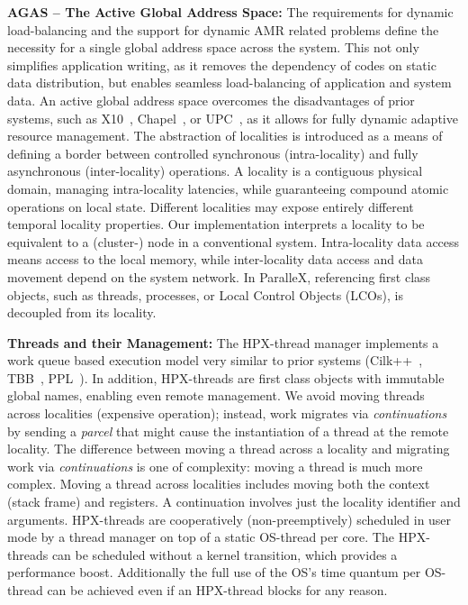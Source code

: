 \documentclass{revtex4}
\newcommand{\I}[1]{\textit{#1}}
\newcommand{\B}[1]{\textbf{#1}}
\begin{document}
\B{AGAS -- The Active Global Address Space:} The requirements for dynamic
load-balancing and the support for dynamic AMR related problems define the
necessity for a single global address space across the system. This not only
simplifies application writing, as it removes the dependency of codes on static
data distribution, but enables seamless load-balancing of application and system
data. An active global address space overcomes the disadvantages of prior systems,
such as X10~\cite{Charles:2005:XOA:1103845.1094852}, Chapel~\cite{Chamberlain07parallelprogrammability},
or UPC~\cite{UPCSpec}, as it allows for fully dynamic adaptive resource management.
The abstraction of localities is introduced as a means of defining a
border between controlled synchronous (intra-locality) and fully asynchronous
(inter-locality) operations. A locality is a contiguous physical domain,
managing intra-locality latencies, while guaranteeing compound atomic operations
on local state. Different localities may expose entirely different temporal
locality properties. Our implementation interprets a locality to be equivalent
to a (cluster-) node in a conventional system. Intra-locality data access means access to
the local memory, while inter-locality data access and data movement
depend on the system network. In ParalleX, referencing first class objects, such as threads,
processes, or Local Control Objects (LCOs),  is decoupled from its locality.

\B{Threads and their Management:} The HPX-thread manager implements a work queue
based execution model very similar to prior systems (Cilk++~\cite{cilk++},
TBB~\cite{inteltbb}, PPL~\cite{microsoftppl}).  In addition, HPX-threads are first
class objects with immutable global names, enabling even remote management.
We avoid moving threads across localities (expensive operation); instead, work
migrates via \I{continuations} by sending a \I{parcel} that might cause the instantiation
of a thread at the remote locality.
The difference between moving a thread across a locality and migrating work
via \I{continuations} is one of complexity: moving a thread is much more complex.  
Moving a thread across localities includes moving both the context (stack frame) 
and registers.  A continuation involves just the locality identifier and arguments.
 HPX-threads are cooperatively (non-preemptively)
scheduled in user mode by a thread manager on top of a static OS-thread per core. The
HPX-threads can be scheduled without a kernel transition, which provides a
performance boost. Additionally the full use of the OS's time quantum per
OS-thread can be achieved even if an HPX-thread blocks for any reason.
\end{document}
